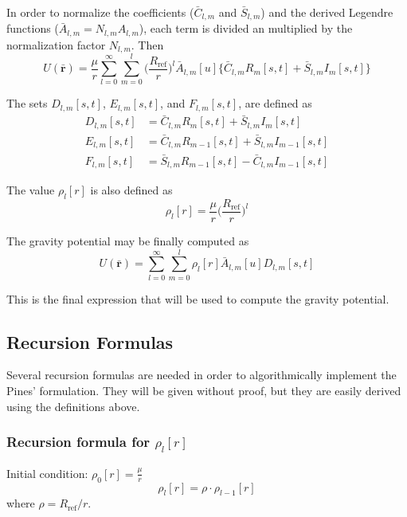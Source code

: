 \documentclass[]{AVSSimReportMemo}
\begin{document}
In order to normalize the coefficients ($\bar C_{l,m}$ and $\bar S_{l,m}$) and the derived Legendre functions ($\bar A_{l,m} = N_{l,m} A_{l,m}$), each term is divided an multiplied by the normalization factor $N_{l,m}$. Then
\begin{equation}
U(\mathbf{\bar r}) = \frac{\mu}{r} \sum_{l=0}^\infty \sum_{m=0}^l \bigg(\frac{R_{\text{ref}}}{r}\bigg)^l \bar A_{l,m}[u] \{\bar C_{l,m} R_m[s,t] + \bar S_{l,m} I_m[s,t]\}
\end{equation}

The sets $D_{l,m}[s,t]$, $E_{l,m}[s,t]$, and $F_{l,m}[s,t]$, are defined as
\begin{align}
D_{l,m}[s,t] &= \bar C_{l,m} R_m[s,t] + \bar S_{l,m} I_m[s,t]\\
E_{l,m}[s,t] &= \bar C_{l,m} R_{m-1}[s,t] + \bar S_{l,m} I_{m-1}[s,t]\\
F_{l,m}[s,t] &= \bar S_{l,m} R_{m-1}[s,t] - \bar C_{l,m} I_{m-1}[s,t]
\end{align}

The value $\rho_l[r]$ is also defined as
\begin{equation}
\rho_l[r] = \frac{\mu}{r} \bigg(\frac{R_{\text{ref}}}{r}\bigg)^l
\end{equation}

The gravity potential may be finally computed as
\begin{equation}
U(\mathbf{\bar r}) = \sum_{l=0}^\infty \sum_{m=0}^l \rho_l[r] \bar A_{l,m}[u] D_{l,m}[s,t]
\end{equation}

This is the final expression that will be used to compute the gravity potential.

\subsection{Recursion Formulas}

Several recursion formulas are needed in order to algorithmically implement the Pines' formulation. They will be given without proof, but they are easily derived using the definitions above.

\subsubsection{Recursion formula for $\rho_l[r]$}

Initial condition: $\rho_0[r] = \frac{\mu}{r}$
\begin{equation}
\rho_l[r] = \rho \cdot \rho_{l-1}[r]
\end{equation}
where $\rho = R_{\text{ref}}/r$.
\end{document}

